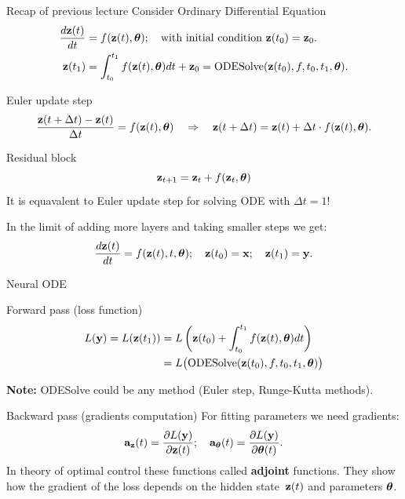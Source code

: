\begin{frame}{Recap of previous lecture}
	Consider Ordinary Differential Equation    
	\begin{align*}
	    \frac{d \mathbf{z}(t)}{dt} &= f(\mathbf{z}(t), \boldsymbol{\theta}); \quad \text{with initial condition }\mathbf{z}(t_0) = \mathbf{z}_0. \\
	    \mathbf{z}(t_1) &= \int^{t_1}_{t_0} f(\mathbf{z}(t), \boldsymbol{\theta}) d t  + \mathbf{z}_0 = \text{ODESolve}(\mathbf{z}(t_0), f, t_0,t_1, \boldsymbol{\theta}).
	\end{align*}
	\vspace{-0.4cm}
	\begin{block}{Euler update step}
		\vspace{-0.6cm}
		\[
		    \frac{\mathbf{z}(t + \Delta t) - \mathbf{z}(t)}{\Delta t} = f(\mathbf{z}(t), \boldsymbol{\theta}) \quad \Rightarrow \quad \mathbf{z}(t + \Delta t) = \mathbf{z}(t) + \Delta t \cdot f(\mathbf{z}(t), \boldsymbol{\theta}).
		\]
		\vspace{-0.7cm}
	\end{block}
	\begin{block}{Residual block}
		\vspace{-0.4cm}
		\[
			\mathbf{z}_{t + 1} = \mathbf{z}_t + f(\mathbf{z}_t, \boldsymbol{\theta})
		\]
		It is equavalent to Euler update step for solving ODE with $\Delta t = 1$!
	\end{block}
	In the limit of adding more layers and taking smaller steps we get: 
	\[
	    \frac{d \mathbf{z}(t)}{dt} = f(\mathbf{z}(t), t, \boldsymbol{\theta}); \quad \mathbf{z}(t_0) = \mathbf{x}; \quad \mathbf{z}(t_1) = \mathbf{y}.
	\]

\end{frame}

\begin{frame}{Neural ODE}
	\begin{block}{Forward pass (loss function)}
		\vspace{-0.8cm}
		\begin{align*}
			L(\mathbf{y}) = L(\mathbf{z}(t_1)) &= L\left( \mathbf{z}(t_0) + \int_{t_0}^{t_1} f(\mathbf{z}(t), \boldsymbol{\theta}) dt \right) \\ &= L\bigl(\text{ODESolve}(\mathbf{z}(t_0), f, t_0,t_1, \boldsymbol{\theta}) \bigr)
		\end{align*}
	\vspace{-0.5cm}
	\end{block}
	\textbf{Note:} ODESolve could be any method (Euler step, Runge-Kutta methods).
	\begin{block}{Backward pass (gradients computation)}
		For fitting parameters we need gradients:
		\[
			\mathbf{a}_{\mathbf{z}}(t) = \frac{\partial L(\mathbf{y})}{\partial \mathbf{z}(t)}; \quad \mathbf{a}_{\boldsymbol{\theta}}(t) = \frac{\partial L(\mathbf{y})}{\partial \boldsymbol{\theta}(t)}.
		\]
		In theory of optimal control these functions called \textbf{adjoint} functions. 
		They show how the gradient of the loss depends on the hidden state~$\mathbf{z}(t)$ and parameters $\boldsymbol{\theta}$.
	\end{block}

\end{frame}

